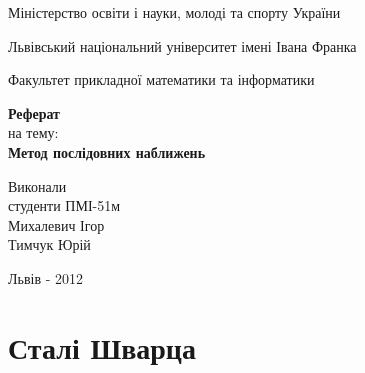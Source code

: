 \documentclass[12pt,a4paper]{article}
\begin{document}

\setlength{\parindent}{1.5cm}
\fontsize{14pt}{6mm}\selectfont

\begin{center}
  Міністерство освіти і науки, молоді та спорту України
  
  Львівський національний університет імені Івана Франка

  Факультет прикладної математики та інформатики
\end{center}


\vspace{6cm}

\begin{center}
  {\bfseries\Large Реферат}\\[0.5cm]
  на тему:\\[0.5cm]
  {\bfseries\Large Метод послідовних наближень}\\
\end{center}

\vspace{2cm}

\begin{flushleft}
  Виконали\\
  студенти ПМІ-51м\\
  Михалевич Ігор\\
  Тимчук Юрій
\end{flushleft}

\vspace{6cm}

\begin{center}
  Львів - 2012 
\end{center}

\clearpage

\fontsize{14pt}{6mm}\selectfont

\section{Сталі Шварца}
\end{document}
